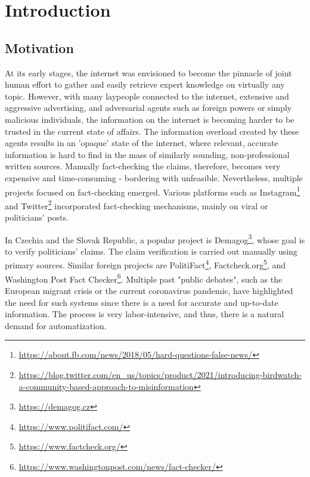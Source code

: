 \chapter*{Introduction}
\section*{Motivation}
At its early stages, the internet was envisioned to become the pinnacle of joint human effort to gather and easily retrieve expert knowledge on virtually any topic.
However, with many laypeople connected to the internet, extensive and aggressive advertising, and adversarial agents such as foreign powers or simply malicious individuals, the information on the internet is becoming harder to be trusted in the current state of affairs.
The information overload created by these agents results in an 'opaque' state of the internet, where relevant, accurate information is hard to find in the mass of similarly sounding, non-professional written sources.
Manually fact-checking the claims, therefore, becomes very expensive and time-consuming - bordering with unfeasible.
Nevertheless, multiple projects focused on fact-checking emerged. 
Various platforms such as Instagram\footnote{\url{https://about.fb.com/news/2018/05/hard-questions-false-news/}} and Twitter\footnote{\url{https://blog.twitter.com/en_us/topics/product/2021/introducing-birdwatch-a-community-based-approach-to-misinformation}} incorporated fact-checking mechanisms, mainly on viral or politicians' posts. 

In Czechia and the Slovak Republic, a popular project is Demagog\footnote{\url{https://demagog.cz}}, whose goal is to verify politicians' claims.
The claim verification is carried out manually using primary sources. 
Similar foreign projects are PolitiFact\footnote{\url{https://www.politifact.com/}}, Factcheck.org\footnote{\url{https://www.factcheck.org/}}, and Washington Post Fact Checker\footnote{\url{https://www.washingtonpost.com/news/fact-checker/}}.
Multiple past "public debates", such as the European migrant crisis or the current coronavirus pandemic, have highlighted the need for such systems since there is a need for accurate and up-to-date information.
The process is very labor-intensive, and thus, there is a natural demand for automatization.

